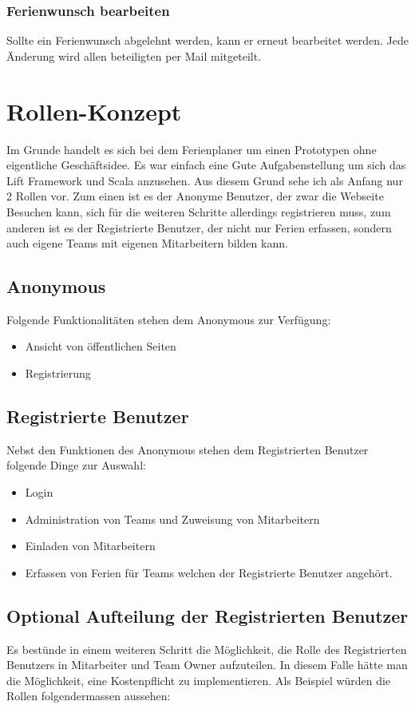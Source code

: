 \subsubsection{Ferienwunsch bearbeiten}
Sollte ein Ferienwunsch abgelehnt werden, kann er erneut bearbeitet werden. Jede \"Anderung wird allen beteiligten per Mail mitgeteilt.

\section{Rollen-Konzept}\label{konzept:rollen}
Im Grunde handelt es sich bei dem Ferienplaner um einen Prototypen ohne eigentliche Gesch\"aftsidee. Es war einfach eine Gute Aufgabenstellung um sich das Lift Framework und Scala anzusehen. Aus diesem Grund sehe ich als Anfang nur 2 Rollen vor. Zum einen ist es der Anonyme Benutzer, der zwar die Webseite Besuchen kann, sich f\"ur die weiteren Schritte allerdings registrieren muss, zum anderen ist es der Registrierte Benutzer, der nicht nur Ferien erfassen, sondern auch eigene Teams mit eigenen Mitarbeitern bilden kann.
\subsection{Anonymous}
Folgende Funktionalit\"aten stehen dem Anonymous zur Verf\"ugung:
\begin{itemize}
\item Ansicht von \"offentlichen Seiten
\item Registrierung
\end{itemize}

\subsection{Registrierte Benutzer}
Nebst den Funktionen des Anonymous stehen dem Registrierten Benutzer folgende Dinge zur Auswahl:
\begin{itemize}
\item Login
\item Administration von Teams und Zuweisung von Mitarbeitern
\item Einladen von Mitarbeitern
\item Erfassen von Ferien f\"ur Teams welchen der Registrierte Benutzer angeh\"ort.
\end{itemize}

\subsection{Optional Aufteilung der Registrierten Benutzer}
Es best\"unde in einem weiteren Schritt die M\"oglichkeit, die Rolle des Registrierten Benutzers in Mitarbeiter und Team Owner aufzuteilen. In diesem Falle h\"atte man die M\"oglichkeit, eine Kostenpflicht zu implementieren. Als Beispiel w\"urden die Rollen folgendermassen aussehen:
